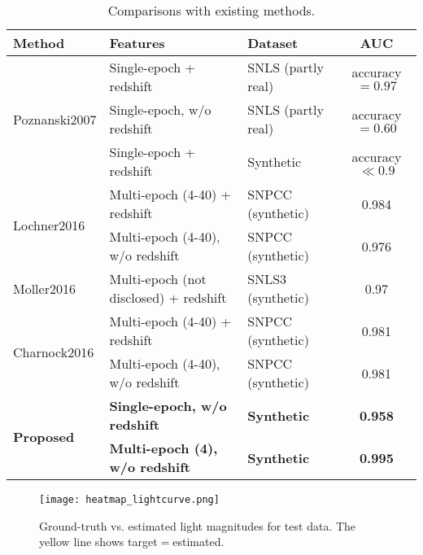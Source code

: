 \documentclass[conference,compsoc]{IEEEtran}
\begin{document}
{\footnotesize
\begin{table*}[t]
  \caption{%
    Comparisons with existing methods.
  }
  \label{table:compare_classify}
  \begin{center}
    \begin{tabular}{|l||l|l|c|} \hline
      Method & Features & Dataset & AUC \\ \hline \hline
      \multirow{3}{*}{Poznanski2007 \cite{Poznanski2007}} & Single-epoch + redshift & SNLS (partly real) & accuracy$=0.97$ \\ \cline{2-4}
       & Single-epoch, w/o redshift & SNLS (partly real) & accuracy$=0.60$ \\ \cline{2-4}
       & Single-epoch + redshift & Synthetic & accuracy$\ll 0.9$ \\ \hline
      \multirow{2}{*}{Lochner2016 \cite{Lochner2016}} & Multi-epoch (4-40) + redshift & SNPCC (synthetic) & 0.984 \\ \cline{2-4}
       & Multi-epoch (4-40), w/o redshift & SNPCC (synthetic) & 0.976 \\ \hline
      Moller2016 \cite{Moller2016} & Multi-epoch (not disclosed) + redshift & SNLS3 (synthetic) & 0.97 \\ \hline
      \multirow{2}{*}{Charnock2016 \cite{Charnock2016}} & Multi-epoch (4-40) + redshift & SNPCC (synthetic) & 0.981 \\ \cline{2-4}
       & Multi-epoch (4-40), w/o redshift & SNPCC (synthetic) & 0.981 \\ \hline
      \multirow{2}{*}{\textbf{Proposed}} & \textbf{Single-epoch, w/o redshift} & \textbf{Synthetic} & \textbf{0.958} \\ \cline{2-4}
       & \textbf{Multi-epoch (4), w/o redshift} & \textbf{Synthetic} & \textbf{0.995} \\ \hline
    \end{tabular}
  \end{center}
\end{table*}
}

\begin{figure}[t]
  \begin{center}
    \texttt{[image: heatmap\_lightcurve.png]}
  \end{center}
  \caption{%
    Ground-truth vs. estimated light magnitudes for test data. The yellow line shows target$=$estimated.
  }
  \label{fig:heatmap_lightcurve}
\end{figure}
\end{document}
